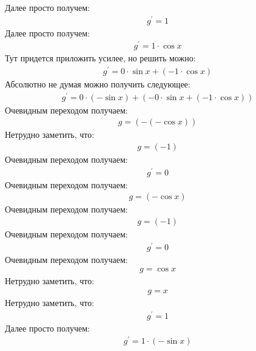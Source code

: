 \documentclass[12pt,a4paper]{scrartcl}
\begin{document}
Далее просто получем:
\begin{gather}\label{eq:f2a58ac0}g^\prime  = 1\end{gather}
Далее просто получем:
\begin{gather}\label{eq:f2a58a90}g^\prime  = 1 \cdot  \cos{ x } \end{gather}
Тут придется приложить усилее, но решить можно:
\begin{gather}\label{eq:f2a588e0}g^\prime  = 0 \cdot  \sin{ x }  +  \left(-1 \cdot  \cos{ x } \right) \end{gather}
Абсолютно не думая можно получить следующее:
\begin{gather}\label{eq:f2a58430}g^\prime  = 0 \cdot  \left(- \sin{ x } \right)  +  \left(-0 \cdot  \sin{ x }  +  \left(-1 \cdot  \cos{ x } \right) \right) \end{gather}
Очевидным переходом получаем:
\begin{gather}\label{eq:f2a589a0}g  =  \left(- \left(- \cos{ x } \right) \right) \end{gather}
Нетрудно заметить, что:
\begin{gather}\label{eq:f2a58940}g  = \left(-1\right)\end{gather}
Очевидным переходом получаем:
\begin{gather}\label{eq:f2a58790}g^\prime  = 0\end{gather}
Очевидным переходом получаем:
\begin{gather}\label{eq:f2a587c0}g  =  \left(- \cos{ x } \right) \end{gather}
Очевидным переходом получаем:
\begin{gather}\label{eq:f2a58820}g  = \left(-1\right)\end{gather}
Очевидным переходом получаем:
\begin{gather}\label{eq:f2a58af0}g^\prime  = 0\end{gather}
Очевидным переходом получаем:
\begin{gather}\label{eq:f2a58850}g  =  \cos{ x } \end{gather}
Нетрудно заметить, что:
\begin{gather}\label{eq:f2a587f0}g  = x\end{gather}
Нетрудно заметить, что:
\begin{gather}\label{eq:f2a58cd0}g^\prime  = 1\end{gather}
Далее просто получем:
\begin{gather}\label{eq:f2a58ca0}g^\prime  = 1 \cdot  \left(- \sin{ x } \right) \end{gather}
\end{document}
